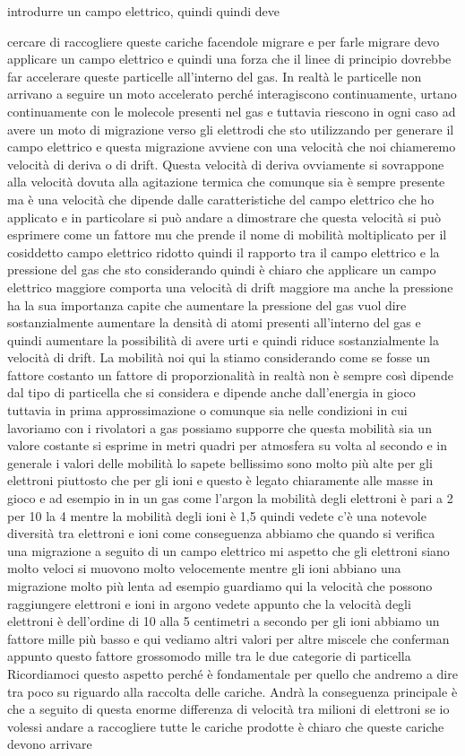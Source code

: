 {introdurre un campo elettrico, quindi quindi deve 

cercare di raccogliere queste cariche facendole migrare e per farle migrare devo applicare un campo elettrico e quindi una forza che il linee di principio dovrebbe far accelerare queste particelle all'interno del gas. In realtà le particelle non arrivano a seguire un moto accelerato perché interagiscono continuamente, urtano continuamente con le molecole presenti nel gas e tuttavia riescono in ogni caso ad avere un moto di migrazione verso gli elettrodi che sto utilizzando per generare il campo elettrico e questa migrazione avviene con una velocità che noi chiameremo velocità di deriva o di drift. Questa velocità di deriva ovviamente si sovrappone alla velocità dovuta alla agitazione termica che comunque sia è sempre presente ma è una velocità che dipende dalle caratteristiche del campo elettrico che ho applicato e in particolare si può andare a dimostrare che questa velocità si può esprimere come un fattore mu che prende il nome di mobilità moltiplicato per il cosiddetto campo elettrico ridotto quindi il rapporto tra il campo elettrico e la pressione del gas che sto considerando quindi è chiaro che applicare un campo elettrico maggiore comporta una velocità di drift maggiore ma anche la pressione ha la sua importanza capite che aumentare la pressione del gas vuol dire sostanzialmente aumentare la densità di atomi presenti all'interno del gas e quindi aumentare la possibilità di avere urti e quindi riduce sostanzialmente la velocità di drift. La mobilità noi qui la stiamo considerando come se fosse un fattore costanto un fattore di proporzionalità in realtà non è sempre così dipende dal tipo di particella che si considera e dipende anche dall'energia in gioco tuttavia in prima approssimazione o comunque sia nelle condizioni in cui lavoriamo con i rivolatori a gas possiamo supporre che questa mobilità sia un valore costante si esprime in metri quadri per atmosfera su volta al secondo e in generale i valori delle mobilità lo sapete bellissimo sono molto più alte per gli elettroni piuttosto che per gli ioni e questo è legato chiaramente alle masse in gioco e ad esempio in in un gas come l'argon la mobilità degli elettroni è pari a 2 per 10 la 4 mentre la mobilità degli ioni è 1,5 quindi vedete c'è una notevole diversità tra elettroni e ioni come conseguenza abbiamo che quando si verifica una migrazione a seguito di un campo elettrico mi aspetto che gli elettroni siano molto veloci si muovono molto velocemente mentre gli ioni abbiano una migrazione molto più lenta ad esempio guardiamo qui la velocità che possono raggiungere elettroni e ioni in argono vedete appunto che la velocità degli elettroni è dell'ordine di 10 alla 5 centimetri a secondo per gli ioni abbiamo un fattore mille più basso e qui vediamo altri valori per altre miscele che conferman appunto questo fattore grossomodo mille tra le due categorie di particella Ricordiamoci questo aspetto perché è fondamentale per quello che andremo a dire tra poco su riguardo alla raccolta delle cariche. Andrà la conseguenza principale è che a seguito di questa enorme differenza di velocità tra milioni di elettroni se io volessi andare a raccogliere tutte le cariche prodotte è chiaro che queste cariche devono arrivare }
